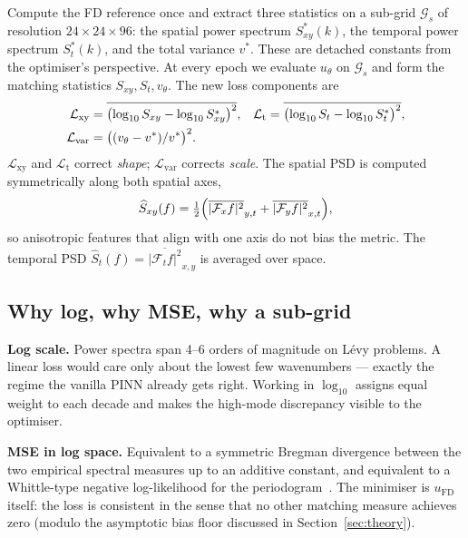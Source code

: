 \documentclass[review,12pt]{elsarticle}
\begin{document}
Compute the FD reference once and extract three statistics on a
sub-grid \(\mathcal{G}_s\) of resolution \(24 \times 24 \times 96\):
the spatial power spectrum \(S^*_{xy}(k)\), the temporal power
spectrum \(S^*_t(k)\), and the total variance \(v^*\). These are
detached constants from the optimiser's perspective. At every epoch
we evaluate \(u_\theta\) on \(\mathcal{G}_s\) and form the matching
statistics \(S_{xy}, S_t, v_\theta\). The new loss components are
\begin{align}
\mathcal{L}_{\mathrm{xy}} &=
\overline{\bigl(\log_{10}S_{xy} - \log_{10}S^*_{xy}\bigr)^2}, &
\mathcal{L}_{\mathrm{t}} &=
\overline{\bigl(\log_{10}S_t - \log_{10}S^*_t\bigr)^2}, \notag\\
\mathcal{L}_{\mathrm{var}} &= \bigl((v_\theta - v^*)/v^*\bigr)^2.
\label{eq:losses}
\end{align}
\(\mathcal{L}_{\mathrm{xy}}\) and \(\mathcal{L}_{\mathrm{t}}\)
correct \emph{shape}; \(\mathcal{L}_{\mathrm{var}}\) corrects
\emph{scale}. The spatial PSD is computed symmetrically along both
spatial axes,
\begin{equation}
\widehat S_{xy}(f) = \tfrac12
\Bigl(\overline{|\mathcal F_x f|^2}_{y,t}
+ \overline{|\mathcal F_y f|^2}_{x,t}\Bigr),
\end{equation}
so anisotropic features that align with one axis do not bias the
metric. The temporal PSD
\(\widehat S_t(f) = \overline{|\mathcal F_t f|^2}_{x,y}\) is
averaged over space.

\subsection{Why log, why MSE, why a sub-grid}

\textbf{Log scale.} Power spectra span 4--6 orders of magnitude on
L\'evy problems. A linear loss would care only about the lowest few
wavenumbers --- exactly the regime the vanilla PINN already gets
right. Working in \(\log_{10}\) assigns equal weight to each decade
and makes the high-mode discrepancy visible to the optimiser.

\textbf{MSE in log space.} Equivalent to a symmetric Bregman
divergence between the two empirical spectral measures up to an
additive constant, and equivalent to a Whittle-type negative
log-likelihood for the periodogram~\cite{Whittle1953,Dahlhaus1996}.
The minimiser is \(u_{\mathrm{FD}}\) itself: the loss is consistent
in the sense that no other matching measure achieves zero (modulo
the asymptotic bias floor discussed in Section~\ref{sec:theory}).
\end{document}
